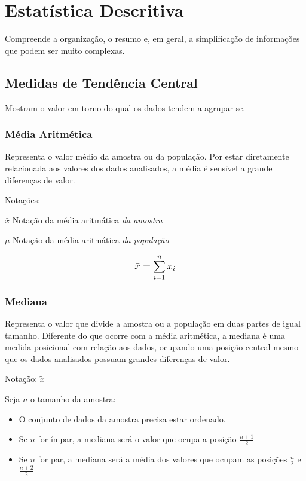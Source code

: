 \chapter{Estatística Descritiva}

Compreende a organização, o resumo e, em geral, a simplificação de informações que podem ser muito complexas.

\section{Medidas de Tendência Central}

Mostram o valor em torno do qual os dados tendem a agrupar-se.

\subsection{Média Aritmética}

Representa o valor médio da amostra ou da população. Por estar diretamente relacionada aos valores dos dados analisados, a média é sensível a grande diferenças de valor. 

Notações:

\(\bar{x}\) Notação da média aritmática \emph{da amostra}

\(\mu\) Notação da média aritmática \emph{da população}

\[\beq{ \bar{x} = \sum_{i=1}^{n} x_i }\] 

\subsection{Mediana}

Representa o valor que divide a amostra ou a população em duas partes de igual tamanho. Diferente do que ocorre com a média aritmética, a mediana é uma medida posicional com relação aos dados, ocupando uma posição central mesmo que os dados analisados possuam grandes diferenças de valor.

Notação: \(\tilde{x}\)

Seja \(n\) o tamanho da amostra:
\begin{itemize}
	\item O conjunto de dados da amostra precisa estar ordenado.
	\item Se \(n\) for ímpar, a mediana será o valor que ocupa a posição \(\frac{n + 1}{2}\)
	\item Se \(n\) for par, a mediana será a média dos valores que ocupam as posições \(\frac{n}{2}\) e \(\frac{n + 2}{2}\)
\end{itemize}

